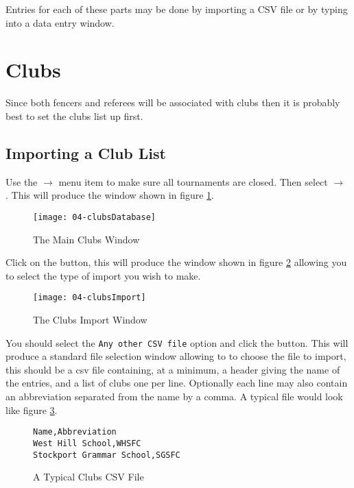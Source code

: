\documentclass[a4paper,11pt]{memoir}
\begin{document}
Entries for each of these parts may be done by importing a CSV file or by typing into a data entry window.

\section{Clubs} 
Since both fencers and referees will be associated with clubs then it is probably best to set the clubs list up first. 

\subsection{Importing a Club List}
Use the  $\rightarrow$  menu item to make sure all tournaments are closed. Then select  $\rightarrow$  . This will produce the window shown in figure \ref{fig:04-clubsDatabase}.

\begin{figure}[!ht]
 \centering
 \texttt{[image: 04-clubsDatabase]}
 \caption{The Main Clubs Window} \label{fig:04-clubsDatabase}
\end{figure}

Click on the  button, this will produce the window shown in figure \ref{fig:04-clubsImport} allowing you to select the type of import you wish to make.

\begin{figure}[!ht]
 \centering
 \texttt{[image: 04-clubsImport]}
 \caption{The Clubs Import Window} \label{fig:04-clubsImport}
\end{figure}

You should select the \texttt{Any other CSV file} option and click the  button. This will produce a standard file selection window allowing to to choose the file to import, this should be a \gls{csv file} containing, at a minimum, a header giving the name of the entries, and a list of clubs one per line. Optionally each line may also contain an abbreviation separated from the name by a comma. A typical file would look like figure \ref{fig:04-clubsCSV}.

\begin{figure}[!ht]
 \begin{verbatim}
Name,Abbreviation
West Hill School,WHSFC
Stockport Grammar School,SGSFC
 \end{verbatim}
 \caption{A Typical Clubs CSV File} \label{fig:04-clubsCSV}
\end{figure}
\end{document}
